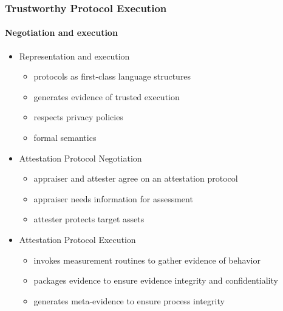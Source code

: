\documentclass{beamer}
\begin{document}
\begin{frame}[fragile]
  \frametitle{Trustworthy Protocol Execution}
  \framesubtitle{Negotiation and execution}

  \begin{itemize}
  \item Representation and execution
    \begin{itemize}
    \item protocols as first-class language structures
    \item generates evidence of trusted execution
    \item respects privacy policies
    \item formal semantics
    \end{itemize}
  \item Attestation Protocol Negotiation
    \begin{itemize}
    \item appraiser and attester agree on an attestation protocol
    \item appraiser needs information for assessment
    \item attester protects target assets
    \end{itemize}
  \item Attestation Protocol Execution
    \begin{itemize}
    \item invokes measurement routines to gather evidence of behavior
    \item packages evidence to ensure evidence integrity and confidentiality
    \item generates meta-evidence to ensure process integrity
    \end{itemize}
  \end{itemize}
  
\end{frame}
\end{document}

